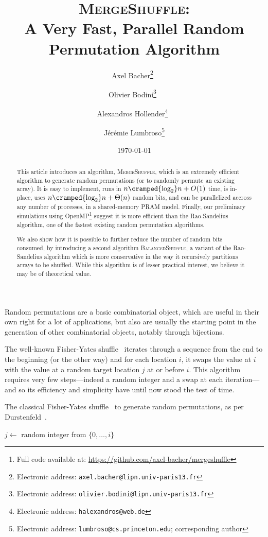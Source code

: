 \documentclass[letter,11pt,en]{quick-document}
\title{\textsc{MergeShuffle}:\\A Very Fast, Parallel Random Permutation
    Algorithm}
\author{Axel Bacher\thanks{Electronic address: \texttt{axel.bacher@lipn.univ-paris13.fr}}~}
\author{Olivier Bodini\thanks{Electronic address: \texttt{olivier.bodini@lipn.univ-paris13.fr}}~}
\author{Alexandros Hollender\thanks{Electronic address: \texttt{halexandros@web.de}}~}
\author{J\'er\'emie Lumbroso\thanks{Electronic address: \texttt{lumbroso@cs.princeton.edu};
    corresponding author}}
\affil{}
\date{\today}
\begin{document}
\maketitle

\begin{abstract}
  This article introduces an algorithm, \textsc{MergeShuffle}, which is an
  extremely efficient algorithm to generate random permutations (or to
  randomly permute an existing array). It is easy to implement, runs in
  $n\cramped{\log_2} n + O(1)$ time, is in-place, uses
  $n\cramped{\log_2} n + \Theta(n)$ random bits, and can be parallelized
  accross any number of processes, in a shared-memory PRAM model. Finally,
  our preliminary simulations using OpenMP\footnote{Full code available
    at: \url{https://github.com/axel-bacher/mergeshuffle}}
  suggest it is more efficient than the Rao-Sandelius algorithm, one of
  the fastest existing random permutation algorithms.

  We also show how it is possible to further reduce the number of random
  bits consumed, by introducing a second algorithm
  \textsc{BalancedShuffle}, a variant of the Rao-Sandelius algorithm which
  is more conservative in the way it recursively partitions arrays to be
  shuffled. While this algorithm is of lesser practical interest, we
  believe it may be of theoretical value.
\end{abstract}


Random permutations are a basic combinatorial object, which are useful in
their own right for a lot of applications, but also are usually the
starting point in the generation of other combinatorial objects, notably
through bijections.

The well-known Fisher-Yates shuffle~\cite{FiYa48,
  Durstenfeld64} iterates through a sequence from the end to the beginning
(or the other way) and for each location $i$, it swaps the value at $i$
with the value at a random target location $j$ at or before $i$. This
algorithm requires very few steps---indeed a random integer and a swap at
each iteration---and so its efficiency and simplicity have until now stood
the test of time.

\begin{algorithm}
  \caption{The classical Fisher-Yates shuffle~\cite{FiYa48} to generate
    random permutations, as per
    Durstenfeld~\cite{Durstenfeld64}.\label{alg-fy-shuffle}}
\begin{algorithmic}[1]
  \State $j \gets$ random integer from $\{0, \ldots, i\}$
  \State {}
\EndFor
\EndProcedure
\end{algorithmic}
\end{algorithm}
\end{document}
